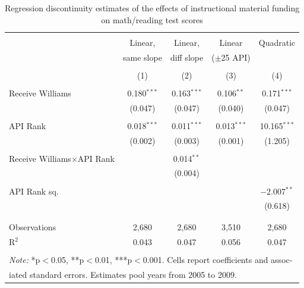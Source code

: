 
\begin{table}[!htbp] \centering 
  \caption{Regression discontinuity estimates of the effects of instructional material funding on math/reading test scores} 
  \label{tab:rd} 
\begin{tabular}{lcccc} 
\\[-1.8ex]\hline 
\hline \\[-1.8ex] 
 & Linear, & Linear, & Linear & Quadratic \\ 
  & same slope & diff slope & ($\pm$25 API) &  \\ 
\\[-1.8ex] & (1) & (2) & (3) & (4)\\ 
\hline \\[-1.8ex] 
 Receive Williams & 0.180$^{***}$ & 0.163$^{***}$ & 0.106$^{**}$ & 0.171$^{***}$ \\ 
  & (0.047) & (0.047) & (0.040) & (0.047) \\ 
  & & & & \\ 
 API Rank & 0.018$^{***}$ & 0.011$^{***}$ & 0.013$^{***}$ & 10.165$^{***}$ \\ 
  & (0.002) & (0.003) & (0.001) & (1.205)  \\ 
  & & & & \\ 
 Receive Williams$\times$API Rank &  & 0.014$^{**}$ &  &  \\ 
  &  & (0.004) &  &  \\ 
  & & & & \\ 
 API Rank sq. &  &  &  & $-$2.007$^{**}$ \\ 
  &  &  &  & (0.618) \\ 
  & & & & \\ 
\hline \\[-1.8ex] 
Observations & 2,680 & 2,680 & 3,510 & 2,680 \\ 
R$^{2}$ & 0.043 & 0.047 & 0.056 & 0.047 \\ 
\hline 
\hline \\[-1.8ex] 
\multicolumn{5}{l}{\textit{Note:} *p$<$0.05, **p$<$0.01, ***p$<$0.001. Cells report coefficients and assoc-} \\
\multicolumn{5}{l}{iated standard errors. Estimates pool years from 2005 to 2009.} \\ 
\end{tabular} 
\end{table} 
